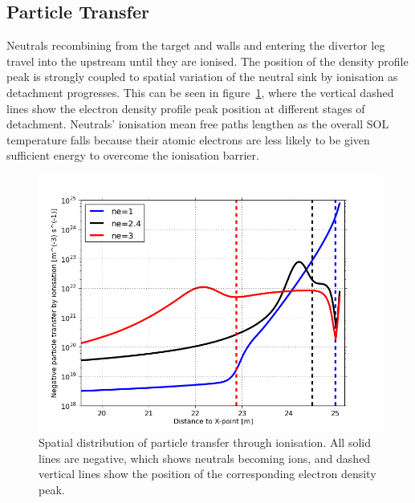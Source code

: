 \documentclass[12pt]{article}  %
\begin{document}
\subsection{Particle Transfer}\label{ssecPtrans}
Neutrals recombining from the target and walls and entering the divertor leg travel into the upstream until they are ionised. The position of the density profile peak is strongly coupled to spatial variation of the neutral sink by ionisation as detachment progresses. This can be seen in figure~\ref{figbalSizthick20m}, where the vertical dashed lines show the electron density profile peak position at different stages of detachment. Neutrals' ionisation mean free paths lengthen as the overall SOL temperature falls because their atomic electrons are less likely to be given sufficient energy to overcome the ionisation barrier.

\begin{figure}
\includegraphics[scale=0.5]{Figures/sol1d/balSizthick20m.png}
\centering
\caption{Spatial distribution of particle transfer through ionisation. All solid lines are negative, which shows neutrals becoming ions, and dashed vertical lines show the position of the corresponding electron density peak.}\label{figbalSizthick20m}
\end{figure}
\end{document}
